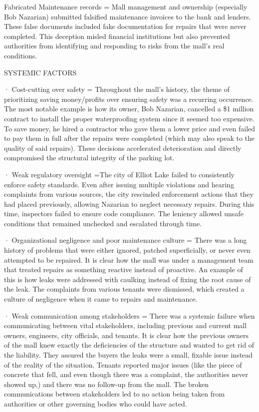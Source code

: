 \documentclass[12pt]{article}
\begin{document}
 

 
Fabricated Maintenance records = Mall management and ownership (especially Bob Nazarian) submitted falsified maintenance invoices to the bank and lenders. These false documents included fake documentation for repairs that were never completed. This deception misled financial institutions but also prevented authorities from identifying and responding to risks from the mall's real conditions. 


SYSTEMIC FACTORS

· Cost-cutting over safety = Throughout the mall's history, the theme of prioritizing saving money/profits over ensuring safety was a recurring occurrence. The most notable example is how its owner, Bob Nazarian, cancelled a \$1 million contract to install the proper waterproofing system since it seemed too expensive. To save money, he hired a contractor who gave them a lower price and even failed to pay them in full after the repairs were completed (which may also speak to the quality of said repairs). These decisions accelerated deterioration and directly compromised the structural integrity of the parking lot. 

 

 · Weak regulatory oversight =The city of Elliot Lake failed to consistently enforce safety standards. Even after issuing multiple violations and hearing complaints from various sources, the city rescinded enforcement actions that they had placed previously, allowing Nazarian to neglect necessary repairs. During this time, inspectors failed to ensure code compliance. The leniency allowed unsafe conditions that remained unchecked and escalated through time. 

 

 · Organizational negligence and poor maintenance culture = There was a long history of problems that were either ignored, patched superficially, or never even attempted to be repaired. It is clear how the mall was under a management team that treated repairs as something reactive instead of proactive. An example of this is how leaks were addressed with caulking instead of fixing the root cause of the leak. The complaints from various tenants were dismissed, which created a culture of negligence when it came to repairs and maintenance. 

 

 · Weak communication among stakeholders = There was a systemic failure when communicating between vital stakeholders, including previous and current mall owners, engineers, city officials, and tenants. It is clear how the previous owners of the mall knew exactly the deficiencies of the structure and wanted to get rid of the liability. They assured the buyers the leaks were a small, fixable issue instead of the reality of the situation. Tenants reported major issues (like the piece of concrete that fell, and even though there was a complaint, the authorities never showed up,) and there was no follow-up from the mall. The broken communications between stakeholders led to no action being taken from authorities or other governing bodies who could have acted. 
\end{document}
